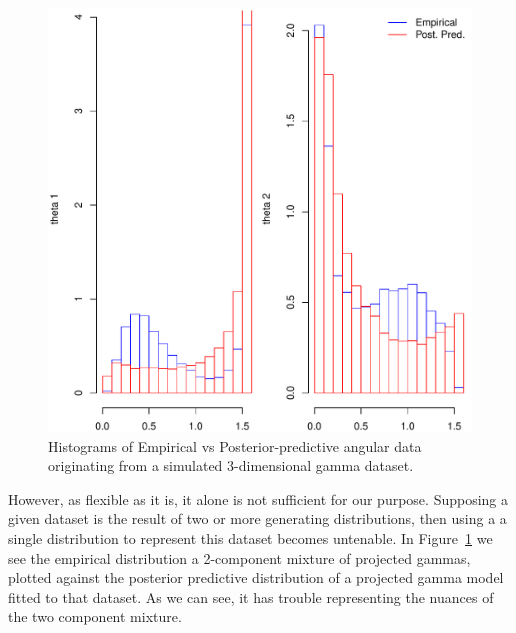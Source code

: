\begin{figure}[h]
  \centering
  \label{fig:vanillamix}
  \includegraphics{./images/justification}
  \caption{Histograms of Empirical vs Posterior-predictive angular data originating
            from a simulated 3-dimensional gamma dataset.}
\end{figure}

However, as flexible as it is, it alone is not sufficient for our purpose.  Supposing
  a given dataset is the result of two or more generating distributions, then using a
  a single distribution to represent this dataset becomes untenable.  In Figure~\ref{fig:vanillamix}
  we see the empirical distribution a 2-component mixture of projected gammas, plotted
  against the posterior predictive distribution of a projected gamma model fitted to
  that dataset.  As we can see, it has trouble representing the nuances of the two
  component mixture.


